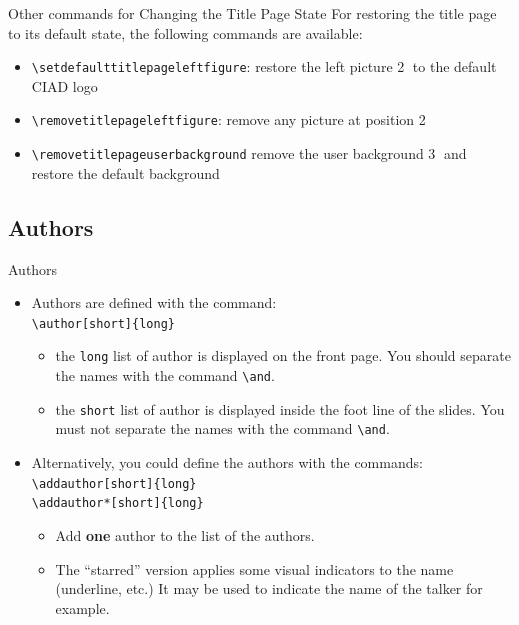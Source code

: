 \documentclass[english,sectioncirclenumberstyle]{ciadbeamer}
\begin{document}
\begin{frame}{{Other commands} for Changing the Title Page State}
	For restoring the title page to its default state, the following commands are available: \\[.25cm]
	\begin{itemize}
		\item \texttt{{\textbackslash}setdefaulttitlepageleftfigure}: restore the left picture \textcircled{2} to the default CIAD logo
		\item \texttt{{\textbackslash}removetitlepageleftfigure}: remove any picture at position \textcircled{2}
		\item \texttt{{\textbackslash}removetitlepageuserbackground} remove the user background \textcircled{3} and restore the default background
	\end{itemize}
\end{frame}

\subsection{Authors}

\begin{frame}{Authors}
	\begin{itemize}
	\item Authors are defined with the command: \\
		\texttt{{\textbackslash}author[short]\{long\}}
		\begin{itemize}
		\item the \texttt{long} list of author is displayed on the front page. You should separate the names with the command \texttt{{\textbackslash}and}.
		\item the \texttt{short} list of author is displayed inside the foot line of the slides. You \alert{must not separate} the names with the command \texttt{{\textbackslash}and}.
		\end{itemize}
	\vfill
	\item \alert{Alternatively}, you could define the authors with the commands: \\
		\texttt{{\textbackslash}addauthor[short]\{long\}} \\
		\texttt{{\textbackslash}addauthor*[short]\{long\}}
		\begin{itemize}
		\item Add \textbf{one} author to the list of the authors.
		\item The ``starred'' version applies some visual indicators to the name (underline, etc.) It may be used to indicate the name of the talker for example.
		\end{itemize}
	\end{itemize}
	\vfill
\end{frame}
\end{document}
